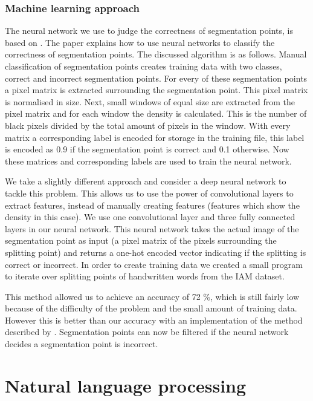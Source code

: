 \documentclass{article}
\begin{document}
\subsubsection{Machine learning approach}
The neural network we use to judge the correctness of segmentation points, is based on \cite{evalsplitpointsnn}. The paper explains how to use neural networks to classify the correctness of segmentation points. The discussed algorithm is as follows. Manual classification of segmentation points creates training data with two classes, correct and incorrect segmentation points.
For every of these segmentation points a pixel matrix is extracted surrounding the segmentation point. This pixel matrix is normalised in size.
Next, small windows of equal size are extracted from the pixel matrix and for each window the density is calculated. This is the number of black pixels divided by the total amount of pixels in the window.
With every matrix a corresponding label is encoded for storage in the training file, this label is encoded as 0.9 if the segmentation point is correct and 0.1 otherwise. Now these matrices and corresponding labels are used to train the neural network.

We take a slightly different approach and consider a deep neural network to tackle this problem. This allows us to use the power of convolutional layers to extract features, instead of manually creating features (features which show the density in this case).
We use one convolutional layer and three fully connected layers in our neural network. This neural network takes the actual image of the segmentation point as input (a pixel matrix of the pixels surrounding the splitting point) and returns a one-hot encoded vector indicating if the splitting is correct or incorrect. In order to create training data we created a small program to iterate over splitting points of handwritten words from the IAM dataset. \cite{iam}

This method allowed us to achieve an accuracy of 72 \%, which is still fairly low because of the difficulty of the problem and the small amount of training data. However this is better than our accuracy with an implementation of the method described by \cite{evalsplitpointsnn}.
Segmentation points can now be filtered if the neural network decides a segmentation point is incorrect.

\section{Natural language processing}
\label{sec:postproc}
\end{document}
